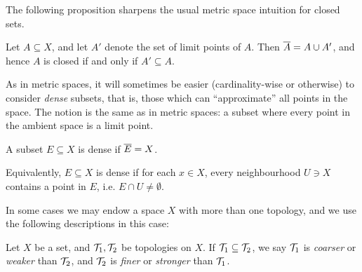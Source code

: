 \documentclass[11pt]{article}
\begin{document}


The following proposition sharpens the usual metric space intuition for closed sets.
\begin{proposition}
    Let $A \subseteq X$, and let $A'$ denote the set of limit points of $A$. Then $\overline{A} = A \cup A'$, and hence $A$ is closed if and only if $A' \subseteq A$.
\end{proposition}

As in metric spaces, it will sometimes be easier (cardinality-wise or otherwise) to consider \emph{dense} subsets, that is, those which can ``approximate'' all points in the space. The notion is the same as in metric spaces: a subset where every point in the ambient space is a limit point.
\begin{definition}
    A subset $E \subseteq X$ is dense if $\overline{E} = X$.
\end{definition}
Equivalently, $E \subseteq X$ is dense if for each $x \in X$, every neighbourhood $U \ni X$ contains a point in $E$, i.e. $E \cap U \neq \emptyset$.

In some cases we may endow a space $X$ with more than one topology, and we use the following descriptions in this case:
\begin{definition}
    Let $X$ be a set, and $\mathcal{T}_1, \mathcal{T}_2$ be topologies on $X$. If $\mathcal{T}_1 \subseteq \mathcal{T}_2$, we say $\mathcal{T}_1$ is \emph{coarser} or \emph{weaker} than $\mathcal{T}_2$, and $\mathcal{T}_2$ is \emph{finer} or \emph{stronger} than $\mathcal{T}_1$.
\end{definition}
\end{document}
